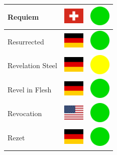 \documentclass[12pt, a4paper, twoside]{report}
\begin{document}
\begin{center}
\begin{longtable}{|p{5cm}|p{2cm}|p{2cm}|}
 Requiem                                                    & \includegraphics[width=1cm]{../img/flags/ch} &   \includegraphics[width=1cm]{../likes/y} \\ \hline
 Resurrected                                                & \includegraphics[width=1cm]{../img/flags/de} &   \includegraphics[width=1cm]{../likes/y} \\ \hline
 Revelation Steel                                           & \includegraphics[width=1cm]{../img/flags/de} &   \includegraphics[width=1cm]{../likes/m} \\ \hline
 Revel in Flesh                                             & \includegraphics[width=1cm]{../img/flags/de} &   \includegraphics[width=1cm]{../likes/y} \\ \hline
 Revocation                                                 & \includegraphics[width=1cm]{../img/flags/us} &   \includegraphics[width=1cm]{../likes/y} \\ \hline
 Rezet                                                      & \includegraphics[width=1cm]{../img/flags/de} &   \includegraphics[width=1cm]{../likes/y} \\ \hline

\end{longtable}
\end{center}
\end{document}
